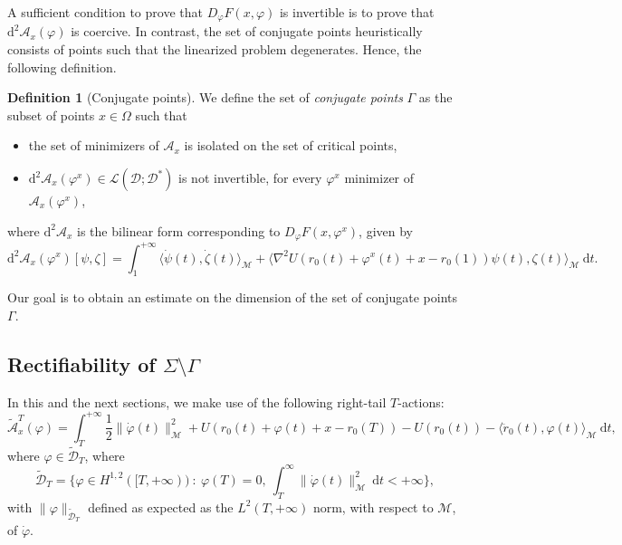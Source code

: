 \documentclass[a4paper,10pt]{amsart}
\newcommand{\ud}{\mathrm{d}}
\theoremstyle{plain}
\theoremstyle{definition}
\newtheorem{defn}[thm]{Definition}
\numberwithin{equation}{section}
\numberwithin{thm}{section}
\begin{document}
A sufficient condition to prove that $D_\varphi F(x,\varphi)$ is invertible is to prove that $\ud^2 \mathcal{A}_x(\varphi)$ is coercive. In contrast, the set of conjugate points heuristically consists of points such that the linearized problem degenerates. Hence, the following definition.

\begin{defn}[Conjugate points]\label{def:conjugate}
    We define the set of \emph{conjugate points} $\Gamma$ as the subset of points $x \in \Omega$ such that 
        \begin{itemize}
        \item the set of minimizers of $\mathcal A_x$ is isolated on the set of critical points,
            \item $\ud^2\mathcal A_{x}(\varphi^x) \in \mathcal{L}(\mathcal{D}; \mathcal{D}^*)$ is not invertible, for every $\varphi^x$ minimizer of $\mathcal A_x(\varphi^x)$,
        \end{itemize}
    where $\ud^2  \mathcal{A}_x$ is the bilinear form corresponding to $D_\varphi F(x,\varphi^x)$, given by
    \begin{equation}
        \label{eq:hessian_A}
    \ud^2 \mathcal{A}_x(\varphi^x)[\psi,\zeta] = \int_{1}^{+\infty} \langle\dot{\psi}(t),\dot{\zeta}(t)\rangle_\mathcal{M} + \langle\nabla^2 U(r_0(t) + \varphi^x(t) + x - r_0(1))\psi(t),\zeta(t)\rangle_\mathcal{M}\ \ud t.
    \end{equation}
\end{defn}

Our goal is to obtain an estimate on the dimension of the set of conjugate points $\Gamma$.




\subsection{Rectifiability of $\Sigma \setminus \Gamma$}

In this and the next sections, we make use of the following right-tail $T$-actions:
\begin{equation}
\label{eq:def_right_tale_func}
\tilde{\mathcal{A}}_{x}^{T}(\varphi) = \int_{T}^{+\infty} \frac{1}{2}\|\dot{\varphi}(t)\|_\mathcal{M}^2 + U(r_0(t) + \varphi(t) + x - r_0(T)) - U(r_0(t)) - \langle\ddot{r}_0(t),\varphi(t)\rangle_\mathcal{M}\ \ud t,
\end{equation}
where  $\varphi \in \tilde{ \mathcal D}_T$, where 
\[
\tilde{\mathcal D}_T = \{\varphi\in H^{1,2}([T,+\infty))\ :\ \varphi(T)=0,\ \int_{T}^{\infty}\|\dot\varphi(t)\|^2_\mathcal{M}\ \ud t<+\infty\},
\]
with $\|\varphi\|_{\tilde{\mathcal D}_T}$ defined as expected as the $L^2(T,+\infty)$ norm, with respect to $\mathcal M$, of $\dot \varphi$.
\end{document}
